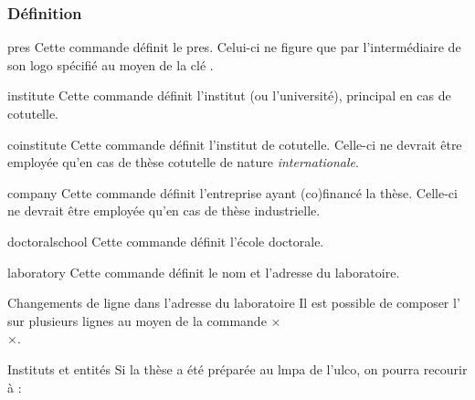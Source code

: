 \subsubsection{Définition}
%
\begin{docCommand}{pres}{}
  Cette commande définit le \gls{pres}. Celui-ci ne figure que
  par l'intermédiaire de son logo spécifié au moyen de la clé .
\end{docCommand}
%
\begin{docCommand}[doc description=\mandatory]{institute}{}
  Cette commande définit l'institut (ou l'université), principal
  en cas de cotutelle.
\end{docCommand}
%
\begin{docCommand}{coinstitute}{}
  Cette commande définit l'institut de cotutelle. Celle-ci ne
  devrait être employée qu'en cas de thèse cotutelle de nature
  \emph{internationale}.
\end{docCommand}
%
\begin{docCommand}{company}{}
  Cette commande définit l'entreprise ayant (co)financé la thèse.
  Celle-ci ne devrait être employée qu'en cas de thèse industrielle.
\end{docCommand}
%
\begin{docCommand}[doc description=\mandatory]{doctoralschool}{}
  Cette commande définit l'école doctorale.
\end{docCommand}
%
\begin{docCommand}[doc description=\mandatory]{laboratory}{}
  Cette commande définit le nom et l'adresse du
  laboratoire.
\end{docCommand}
%
\begin{dbremark}{Changements de ligne dans l'adresse du laboratoire}{}
  Il est possible de composer l' sur plusieurs
  lignes au moyen de la commande ×\\×.
\end{dbremark}
%
\begin{dbexample}{Instituts et entités}{}
  Si la thèse a été préparée au \gls{lmpa} de l'\gls{ulco}, on
  pourra recourir à :
  \NoAutoSpacing%
\begin{bodycode}
\end{bodycode}
\end{dbexample}
